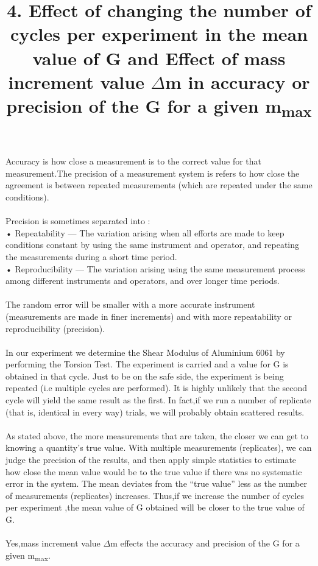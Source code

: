 \documentclass[12pt,a4paper]{article}	%
\title{4. Effect of changing the number of cycles per experiment in the mean value of G and Effect of mass increment value $\Delta$m in accuracy or precision of the G for a given
m\textsubscript{max}}
\date{\vspace{-5ex}}	%
\begin{document}
\maketitle
Accuracy is how close a measurement is to the correct value for that measurement.The precision of a measurement system is refers to how close the agreement is between repeated measurements (which are repeated under the same conditions).\\ \\
Precision is sometimes separated into :\\
    • Repeatability — The variation arising when all efforts are made to keep conditions constant by using the same instrument and operator, and repeating the measurements during a short time period. \\
    • Reproducibility — The variation arising using the same measurement process among different instruments and operators, and over longer time periods. 
\\
\\
The random error will be smaller with a more accurate instrument (measurements are made in finer increments) and with more repeatability or reproducibility (precision). \\
\\
In our experiment we determine the Shear Modulus of Aluminium 6061 by performing the Torsion Test. The experiment is carried and a value for G is obtained in that cycle. Just to be on the safe side, the experiment is being repeated (i.e multiple cycles are performed). It is highly unlikely that the second cycle will yield the same result as the first. In fact,if we run a number of replicate (that is, identical in every way) trials, we will probably obtain scattered results.\\
\\
As stated above, the more measurements that are taken, the closer we can get to knowing a quantity’s true value. With multiple measurements (replicates), we can judge the precision of the results, and then apply simple statistics to estimate how close the mean value would be to the true value if there was no systematic error in the system. The mean deviates from the “true value” less as the number of measurements (replicates) increases.
Thus,if we increase the number of cycles per experiment ,the mean value of G obtained will be closer to the true value of G.\\
\\
Yes,mass increment value $\Delta$m effects the accuracy and precision of the G for a given m\textsubscript{max}.\\
\end{document}
